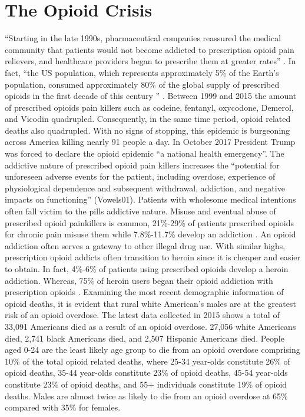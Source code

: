 \documentclass[sigconf]{acmart}
\begin{document}
\section{The Opioid Crisis}
 ``Starting in the late 1990s, pharmaceutical companies reassured the medical community that patients would not become addicted to prescription opioid pain relievers, and healthcare providers began to prescribe them at greater rates'' \cite{opsis1}. In fact, ``the US population, which represents approximately 5\% of the Earth’s population, consumed approximately 80\% of the global supply of prescribed opioids in the first decade of this century '' \cite{Vowles01}. Between 1999 and 2015 the amount of prescribed opioids pain killers such as codeine, fentanyl, oxycodone, Demerol, and Vicodin quadrupled. Consequently, in the same time period, opioid related deaths also quadrupled.  With no signs of stopping, this epidemic is burgeoning across America killing nearly 91 people a day\cite{opsis10}. In October 2017 President Trump was forced to declare the opioid epidemic ``a national health emergency''\cite{opsis3}. The addictive nature of prescribed opioid pain killers increases the “potential for unforeseen adverse events for the patient, including overdose, experience of physiological dependence and subsequent withdrawal, addiction, and negative impacts on functioning” (Vowels01). Patients with wholesome medical intentions often fall victim to the pills addictive nature. Misuse and eventual abuse of prescribed opioid painkillers is common, 21\%-29\% of patients prescribed opioids for chronic pain misuse them while 7.8\%-11.7\% develop an addiction \cite{Vowles01}. An opioid addiction often serves a gateway to other illegal drug use. With similar highs, prescription opioid addicts often transition to heroin since it is cheaper and easier to obtain. In fact, 4\%-6\% of patients using prescribed opioids develop a heroin addiction\cite{opsis1}. Whereas, 75\% of heroin users began their opioid addiction with prescription opioids \cite{Cicero01}. Examining the most recent demographic information of opioid deaths, it is evident that rural white American’s males are at the greatest risk of an opioid overdose. The latest data collected in 2015 shows a total of 33,091 Americans died as a result of an opioid overdose. 27,056 white Americans died, 2,741 black Americans died, and 2,507 Hispanic Americans died. People aged 0-24 are the least likely age group to die from an opioid overdose comprising 10\% of the total opioid related deaths, where 25-34 year-olds constitute 26\% of opioid deaths, 35-44 year-olds constitute 23\% of opioid deaths, 45-54 year-olds constitute 23\% of opioid deaths, and 55+ individuals constitute 19\% of opioid deaths. Males are almost twice as likely to die from an opioid overdose at 65\% compared with 35\% for females\cite{opsis4}.
\end{document}
